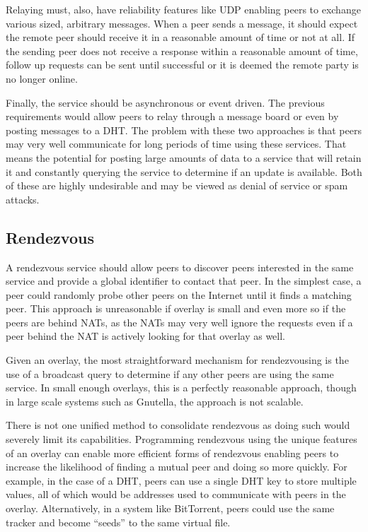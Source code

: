 \documentclass[conference]{IEEEtran}
\begin{document}
Relaying must, also, have reliability features like UDP enabling peers to
exchange various sized, arbitrary messages.  When a peer sends a message, it
should expect the remote peer should receive it in a reasonable amount of time
or not at all.  If the sending peer does not receive a response within a
reasonable amount of time, follow up requests can be sent until successful or
it is deemed the remote party is no longer online.  

Finally, the service should be asynchronous or event driven.  The previous
requirements would allow peers to relay through a message board or even by
posting messages to a DHT.  The problem with these two approaches is that peers
may very well communicate for long periods of time using these services.  That
means the potential for posting large amounts of data to a service that will
retain it and constantly querying the service to determine if an update is
available.  Both of these are highly undesirable and may be viewed as denial of
service or spam attacks.

\subsection{Rendezvous}
\label{rendezvous}

A rendezvous service should allow peers to discover peers interested in the
same service and provide a global identifier to contact that peer.  In the
simplest case, a peer could randomly probe other peers on the Internet until it
finds a matching peer.  This approach is unreasonable if overlay is small and
even more so if the peers are behind NATs, as the NATs may very well ignore the
requests even if a peer behind the NAT is actively looking for that overlay as
well.

Given an overlay, the most straightforward mechanism for rendezvousing is the
use of a broadcast query to determine if any other peers are using the same
service.  In small enough overlays, this is a perfectly reasonable approach,
though in large scale systems such as Gnutella, the approach is not scalable.

There is not one unified method to consolidate rendezvous as doing such would
severely limit its capabilities.  Programming rendezvous using the unique
features of an overlay can enable more efficient forms of rendezvous enabling
peers to increase the likelihood of finding a mutual peer and doing so more
quickly.  For example, in the case of a DHT, peers can use a single DHT key to
store multiple values, all of which would be addresses used to communicate with
peers in the overlay.  Alternatively, in a system like BitTorrent, peers could
use the same tracker and become ``seeds'' to the same virtual file.
\end{document}
